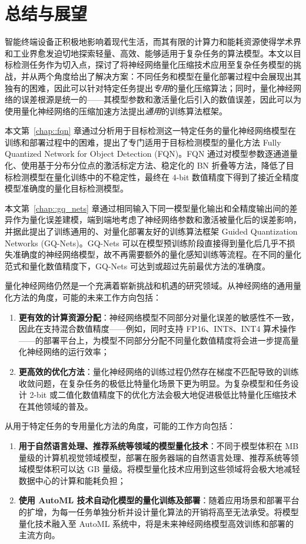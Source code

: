 \documentclass[
  fontset = mac,
]{shtthesis}
\begin{document}
\chapter{总结与展望}
智能终端设备正积极地影响着现代生活，而其有限的计算力和能耗资源使得学术界和工业界愈发迫切地探索轻量、高效、能够适用于复杂任务的算法模型。本文以目标检测任务作为切入点，探讨了将神经网络量化压缩技术应用至复杂任务模型的挑战，并从两个角度给出了解决方案：不同任务和模型在量化部署过程中会展现出其独有的困难，因此可以针对特定任务提出\emph{专用}的量化压缩算法；同时，量化神经网络的误差根源是统一的——其模型参数和激活量化后引入的数值误差，因此可以为使用量化神经网络的压缩加速方法提出\emph{通用}的训练算法框架。

本文第~\ref{chap::fqn} 章通过分析用于目标检测这一特定任务的量化神经网络模型在训练和部署过程中的困难，提出了专门适用于目标检测模型的量化方法 Fully Quantized Network for Object Detection (FQN)。FQN 通过对模型参数逐通道量化、使用基于分布分位点的激活标定方法、稳定化的 BN 折叠等方法，降低了目标检测模型在量化训练中的不稳定性，最终在 4-bit 数值精度下得到了接近全精度模型准确度的量化目标检测模型。

本文第~\ref{chap::gq_nets} 章通过相同输入下同一模型量化输出和全精度输出间的差异作为量化误差建模，端到端地考虑了神经网络参数和激活被量化后的误差影响，并据此提出了训练通用的、对量化部署友好的训练算法框架 Guided Quantization Networks (GQ-Nets)。GQ-Nets 可以在模型预训练阶段直接得到量化后几乎不损失准确度的神经网络模型，故不再需要额外的量化感知训练等流程。在不同的量化范式和量化数值精度下，GQ-Nets 可达到或超过先前最优方法的准确度。

量化神经网络仍然是一个充满着崭新挑战和机遇的研究领域。从神经网络的通用量化方法的角度，可能的未来工作方向包括：
\begin{enumerate}
  \item \textbf{更有效的计算资源分配}：神经网络模型不同部分对量化误差的敏感性不一致，因此在支持混合数值精度——例如，同时支持 FP16、INT8、INT4 算术操作——的部署平台上，为模型不同部分分配不同量化数值精度将会进一步提高量化神经网络的运行效率；
  \item \textbf{更高效的优化方法}：量化神经网络的训练过程仍然存在梯度不匹配导致的训练收敛问题，在复杂任务的极低比特量化场景下更为明显。为复杂模型和任务设计 2-bit 或二值化数值精度下的优化方法会极大地促进极低比特量化压缩技术在其他领域的普及。
\end{enumerate}

从用于特定任务的专用量化方法的角度，可能的工作方向包括：
\begin{enumerate}
  \item \textbf{用于自然语言处理、推荐系统等领域的模型量化技术}：不同于模型体积在 MB 量级的计算机视觉领域模型，部署在服务器端的自然语言处理、推荐系统等领域模型体积可以达 GB 量级。将模型量化技术应用到这些领域将会极大地减轻数据中心的计算和能耗负担；
  \item \textbf{使用 AutoML 技术自动化模型的量化训练及部署}：随着应用场景和部署平台的扩增，为每一任务单独分析并设计量化算法的开销将高至无法承受。将模型量化技术融入至 AutoML 系统中，将是未来神经网络模型高效训练和部署的主流方向。
\end{enumerate}
\end{document}
